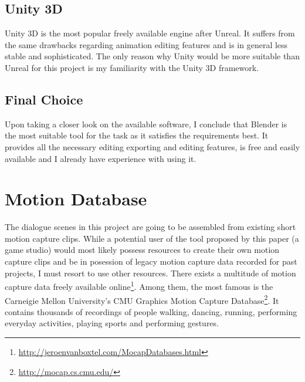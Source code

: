 \subsection{Unity 3D}

Unity 3D is the most popular freely available engine after Unreal. It suffers from the same drawbacks regarding animation editing features and is in general less stable and sophisticated. The only reason why Unity would be more suitable than Unreal for this project is my familiarity with the Unity 3D framework.


\subsection{Final Choice}

Upon taking a closer look on the available software, I conclude that Blender is the most suitable tool for the task as it satisfies the requirements best. It provides all the necessary editing exporting and editing features, is free and easily available and I already have experience with using it.



\section{Motion Database}

The dialogue scenes in this project are going to be assembled from existing short motion capture clips. While a potential user of the tool proposed by this paper (a game studio) would most likely possess resources to create their own motion capture clips and be in posession of legacy motion capture data recorded for past projects, I must resort to use other resources. There exists a multitude of motion capture data freely available online\footnote{\url{http://jeroenvanboxtel.com/MocapDatabases.html}}. Among them, the most famous is the Carneigie Mellon University's CMU Graphics Motion Capture Database\footnote{\url{http://mocap.cs.cmu.edu/}}. It contains thousands of recordings of people walking, dancing, running, performing everyday activities, playing sports and performing gestures.

